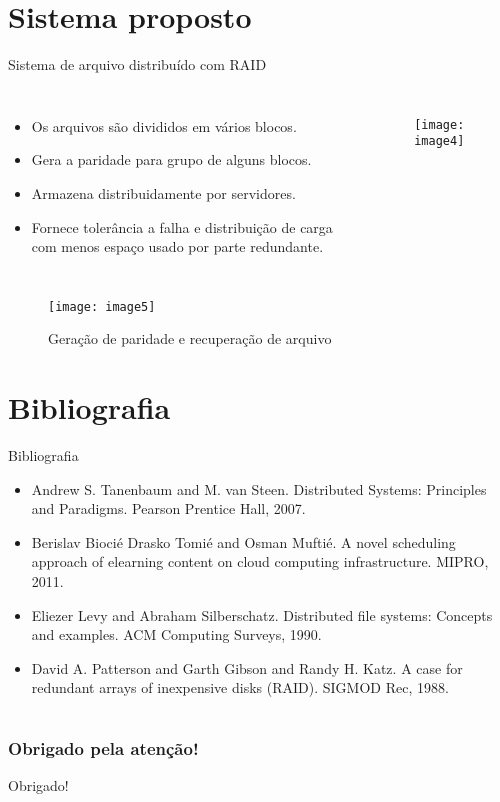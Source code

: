 \section{Sistema proposto}
\begin{frame}{Sistema de arquivo distribuído com RAID}
	
	\begin{columns}
		\begin{itemize}
			\item Os arquivos são divididos em vários blocos.
			\item Gera a paridade para grupo de alguns blocos.
			\item Armazena distribuidamente por servidores.
			\item Fornece tolerância a falha e distribuição de carga com menos espaço usado por parte redundante.
		\end{itemize}
		
		\begin{figure}
			\texttt{[image: image4]}
			\label{fig:exemplo}
		\end{figure}
	\end{columns}
	
\end{frame}


\begin{frame}{}
	
	\begin{figure}
		\texttt{[image: image5]}
		\caption{Geração de paridade e recuperação de arquivo}
		\label{fig:exemplo}
	\end{figure}
	
\end{frame}

\section{Bibliografia}
\begin{frame}{Bibliografia}
	\begin{itemize}
		\item Andrew S. Tanenbaum and M. van Steen. Distributed Systems: Principles and Paradigms. Pearson Prentice Hall, 2007.
		\item Berislav Biocié Drasko Tomié and Osman Muftié. A novel scheduling approach of elearning content on cloud computing infrastructure. MIPRO, 2011.
		\item Eliezer Levy and Abraham Silberschatz. Distributed file systems: Concepts and examples. ACM Computing Surveys, 1990.
		\item David A. Patterson and Garth Gibson and Randy H. Katz. A case for redundant arrays
		of inexpensive disks (RAID). SIGMOD Rec, 1988.
	\end{itemize}
\end{frame}

\section{}
\begin{frame}
	\frametitle{Obrigado pela atenção!}
	\begin{center}
		{\Huge Obrigado!}
	\end{center}
\end{frame}
